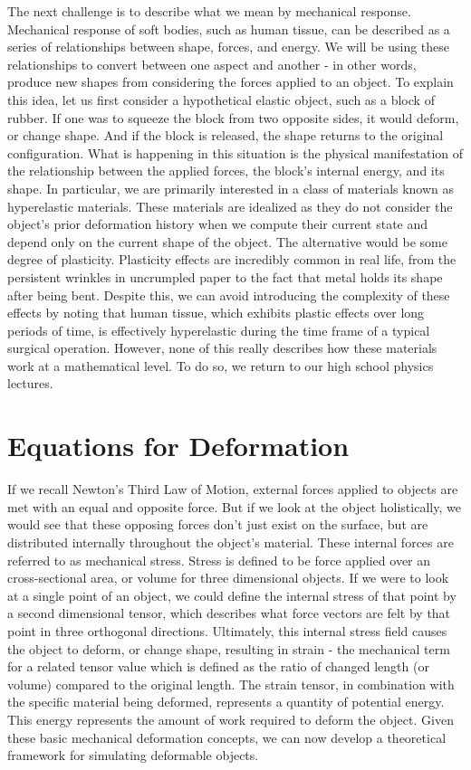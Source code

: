 The next challenge is to describe what we mean by mechanical
response. Mechanical response of soft bodies, such as human tissue,
can be described as a series of relationships between shape, forces,
and energy. We will be using these relationships to convert between
one aspect and another - in other words, produce new shapes from
considering the forces applied to an object. To explain this idea, let
us first consider a hypothetical elastic object, such as a block of
rubber. If one was to squeeze the block from two opposite sides, it
would deform, or change shape. And if the block is released, the shape
returns to the original configuration. What is happening in this
situation is the physical manifestation of the relationship between
the applied forces, the block's internal energy, and its shape. In
particular, we are primarily interested in a class of materials known
as \gls{hyperelastic} materials. These materials are idealized as they
do not consider the object's prior deformation history when we compute
their current state and depend only on the current shape of the
object. The alternative would be some degree of
\gls{plasticity}. Plasticity effects are incredibly common in real
life, from the persistent wrinkles in uncrumpled paper to the fact
that metal holds its shape after being bent. Despite this, we can
avoid introducing the complexity of these effects by noting that human
tissue, which exhibits plastic effects over long periods of time, is
effectively hyperelastic during the time frame of a typical surgical
operation. However, none of this really describes how these materials
work at a mathematical level. To do so, we return to our high school
physics lectures.

\section{Equations for Deformation}

If we recall Newton's Third Law of Motion, external forces applied to
objects are met with an equal and opposite force. But if we look at
the object holistically, we would see that these opposing forces
don't just exist on the surface, but are distributed internally
throughout the object's material. These internal forces are referred
to as mechanical stress. Stress is defined to be force applied over an
cross-sectional area, or volume for three dimensional objects. If we
were to look at a single point of an object, we could define the
internal stress of that point by a second dimensional tensor, which
describes what force vectors are felt by that point in three
orthogonal directions. Ultimately, this internal stress field causes
the object to deform, or change shape, resulting in strain - the
mechanical term for a related tensor value which is defined as the
ratio of changed length (or volume) compared to the original
length. The strain tensor, in combination with the specific material
being deformed, represents a quantity of potential energy. This energy
represents the amount of work required to deform the object.  Given
these basic mechanical deformation concepts, we can now develop a
theoretical framework for simulating deformable objects.

